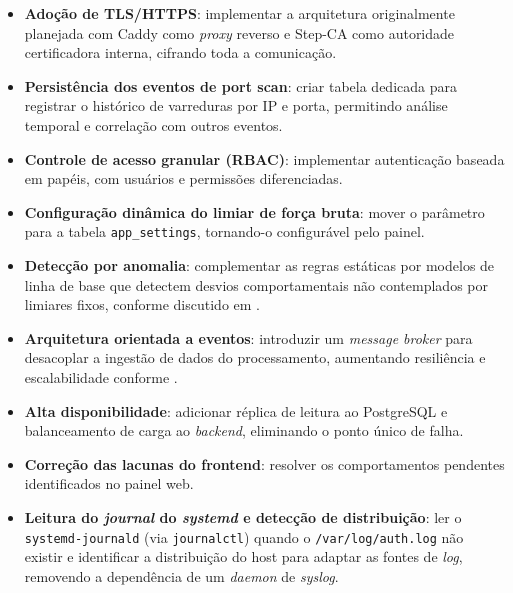 \documentclass[
    12pt
    ,oneside
    ,a4paper
    ,chapter=TITLE
    ,section=TITLE
    ,sumario=abnt-6027-2012]{abntex2}
\begin{document}
\begin{itemize}
    \item \textbf{Adoção de TLS/HTTPS}: implementar a arquitetura originalmente
          planejada com Caddy como \textit{proxy} reverso e Step-CA como autoridade
          certificadora interna, cifrando toda a comunicação.
    \item \textbf{Persistência dos eventos de port scan}: criar tabela dedicada para
          registrar o histórico de varreduras por IP e porta, permitindo análise
          temporal e correlação com outros eventos.
    \item \textbf{Controle de acesso granular (RBAC)}: implementar autenticação
          baseada em papéis, com usuários e permissões diferenciadas.
    \item \textbf{Configuração dinâmica do limiar de força bruta}: mover o parâmetro
          para a tabela \texttt{app\_settings}, tornando-o configurável pelo painel.
    \item \textbf{Detecção por anomalia}: complementar as regras estáticas por
          modelos de linha de base que detectem desvios comportamentais não
          contemplados por limiares fixos, conforme discutido em
          .
    \item \textbf{Arquitetura orientada a eventos}: introduzir um
          \textit{message broker} para desacoplar a ingestão de dados do
          processamento, aumentando resiliência e escalabilidade conforme
          .
    \item \textbf{Alta disponibilidade}: adicionar réplica de leitura ao PostgreSQL
          e balanceamento de carga ao \textit{backend}, eliminando o ponto único de
          falha.
    \item \textbf{Correção das lacunas do frontend}: resolver os comportamentos
          pendentes identificados no painel web.
    \item \textbf{Leitura do \textit{journal} do \textit{systemd} e detecção de
          distribuição}: ler o \texttt{systemd-journald} (via \texttt{journalctl}) quando o
          \texttt{/var/log/auth.log} não existir e identificar a distribuição do host para
          adaptar as fontes de \textit{log}, removendo a dependência de um \textit{daemon}
          de \textit{syslog}.
\end{itemize}

\end{document}
